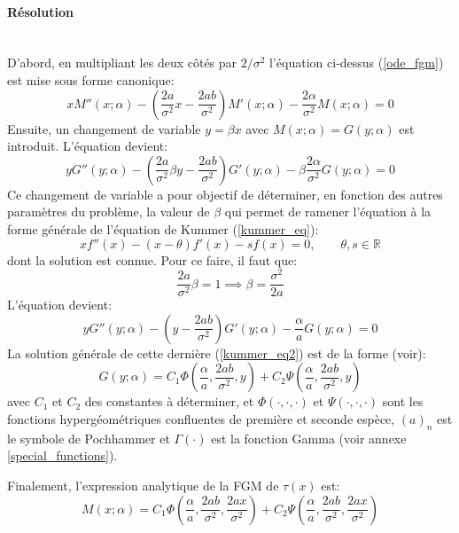 \paragraph{Résolution}\phantom{}\\
D'abord, en multipliant les deux côtés par $2/\sigma^2$ l'équation ci-dessus (\ref{ode_fgm}) est mise sous forme canonique: 
\[
xM''(x;\alpha)-\left(\frac{2a}{\sigma^2}x-\frac{2ab}{\sigma^2}\right)M'(x;\alpha)-\frac{2\alpha}{\sigma^2} M(x;\alpha)=0
\]
Ensuite, un changement de variable $y=\beta x$ avec $M(x;\alpha)=G(y;\alpha)$ est introduit. L'équation devient: 
\[
yG''(y;\alpha)-\left(\frac{2a}{\sigma^2} \beta y - \frac{2ab}{\sigma^2}\right)G'(y;\alpha)-\beta\frac{2\alpha}{\sigma^2} G(y;\alpha) = 0
\]
Ce changement de variable a pour objectif de déterminer, en fonction des autres paramètres du problème, la valeur de $\beta$ qui permet de ramener l'équation à la forme générale de l'équation de Kummer (\ref{kummer_eq}): 
\begin{equation}\label{kummer_eq}
    xf''(x)-(x-\theta)f'(x)-s f(x)=0,\quad\quad \theta,s\in\mathds{R}
\end{equation}
dont la solution est connue. Pour ce faire, il faut que:
\[
\frac{2a}{\sigma^2} \beta=1\implies\beta=\frac{\sigma^2}{2a}
\]
L'équation devient:
\begin{equation}\label{kummer_eq2}
    yG''(y;\alpha)-\left(y-\frac{2ab}{\sigma^2}\right)G'(y;\alpha)-\frac{\alpha}{a}G(y;\alpha) = 0
\end{equation}
La solution générale de cette dernière (\ref{kummer_eq2}) est de la forme (voir\cite{magnus1966}): 
\[G(y;\alpha) = C_1\Phi\left(\frac{\alpha}{a}, \frac{2ab}{\sigma^2}, y\right) + C_2\Psi\left(\frac{\alpha}{a}, \frac{2ab}{\sigma^2}, y\right)\]
avec $C_1$ et $C_2$ des constantes à déterminer, et $\Phi(\cdot, \cdot, \cdot)$ et $\Psi(\cdot, \cdot, \cdot)$ sont les fonctions hypergéométriques confluentes de première et seconde espèce, ${(a)}_n$ est le symbole de Pochhammer et $\Gamma(\cdot)$ est la fonction Gamma (voir annexe \ref{special_functions}).

Finalement, l'expression analytique de la \acs{FGM} de $\tau(x)$ est: 
\begin{equation}\label{sol_fgm}
    M(x;\alpha) = C_1\Phi\left(\frac{\alpha}{a}, \frac{2ab}{\sigma^2}, \frac{2ax}{\sigma^2}\right) + C_2\Psi\left(\frac{\alpha}{a}, \frac{2ab}{\sigma^2}, \frac{2ax}{\sigma^2}\right)
\end{equation}

